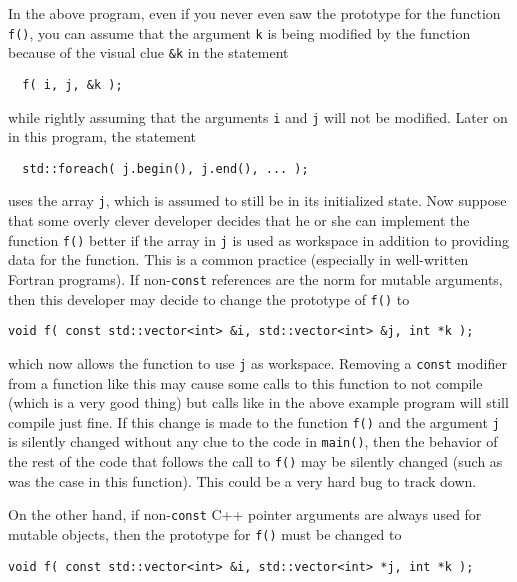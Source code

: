 In the above program, even if you never even saw the prototype
for the function {}\texttt{f()}, you can assume that the argument
{}\texttt{k} is being modified by the function because of the visual
clue {}\texttt{\&k} in the statement

{\scriptsize\begin{verbatim}
  f( i, j, &k );
\end{verbatim}}

{}\noindent{}while rightly assuming that the arguments {}\texttt{i}
and {}\texttt{j} will not be modified.  Later on in this program,
the statement

{\scriptsize\begin{verbatim}
  std::foreach( j.begin(), j.end(), ... );
\end{verbatim}}

{}\noindent{}uses the array {}\texttt{j}, which is assumed to still be
in its initialized state.  Now suppose that some overly clever
developer decides that he or she can implement the function
{}\texttt{f()} better if the array in {}\texttt{j} is used as
workspace in addition to providing data for the function.  This is a
common practice (especially in well-written Fortran programs).  If
non-\texttt{const} references are the norm for mutable arguments, then
this developer may decide to change the prototype of {}\texttt{f()} to

{\scriptsize\begin{verbatim}
void f( const std::vector<int> &i, std::vector<int> &j, int *k );
\end{verbatim}}

{}\noindent{}which now allows the function to use {}\texttt{j} as
workspace.  Removing a {}\texttt{const} modifier from a function like
this may cause some calls to this function to not compile (which is a
very good thing) but calls like in the above example program will
still compile just fine.  If this change is made to the function
{}\texttt{f()} and the argument {}\texttt{j} is silently changed
without any clue to the code in {}\texttt{main()}, then the behavior
of the rest of the code that follows the call to {}\texttt{f()} may be
silently changed (such as was the case in this function).  This could
be a very hard bug to track down.

On the other hand, if non-\texttt{const} C++ pointer arguments are
always used for mutable objects, then the prototype for {}\texttt{f()}
must be changed to 

{\scriptsize\begin{verbatim}
void f( const std::vector<int> &i, std::vector<int> *j, int *k );
\end{verbatim}}

